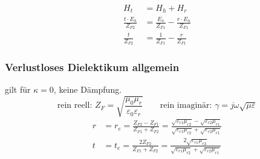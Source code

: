 %

\begin{align*}
    H_t                         & = H_h + H_r                                          \\
    \frac{t\cdot E_{h}}{Z_{F2}} & = \frac{E_{h}}{Z_{F1}} - \frac{r\cdot E_{h}}{Z_{F1}} \\
    \frac{t}{Z_{F2}}            & = \frac{1}{Z_{F1}} - \frac{r}{Z_{F1}}
\end{align*}




\subsubsection[Senkrechter Einfall ideales/verlustl. Dielekt.]{Verlustloses Dielektikum allgemein}
gilt für $ \kappa =0 $, keine Dämpfung.
\[ \text{rein reell: }Z_F=  \sqrt{\frac{\mu_0\mu_r}{\varepsilon_0\varepsilon_r}}  \qquad
\text{rein imaginär: }\gamma  = j \omega\sqrt{\mu\varepsilon} \]
\begin{align*}
    r & = r_e =\frac{Z_{F2} - Z_{F1}}{Z_{F1} + Z_{F2}} = \frac{\sqrt{\varepsilon_{r1}\mu_{r2}} - \sqrt{\varepsilon_{r2}\mu_{r1}} }{\sqrt{\varepsilon_{r1}\mu_{r2}}+{\sqrt{\varepsilon_{r2}\mu_{r1}}}} \\
    t & = t_e = \frac{2 Z_{F2}}{Z_{F1} + Z_{F2}} = \frac{2\sqrt{\varepsilon_{r1}\mu_{r2}}}{\sqrt{\varepsilon_{r1}\mu_{r2}}+\sqrt{\varepsilon_{r2}\mu_{r1}}}
\end{align*}



